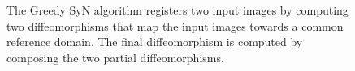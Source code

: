 \begin{figure}[t]
\centering
{}
\caption{{\small The Greedy SyN algorithm registers two input images by computing two diffeomorphisms that map the input images towards a common reference domain. The final
diffeomorphism is computed by composing the two partial diffeomorphisms.}}
\label{fig:syn_overview}
\end{figure}

